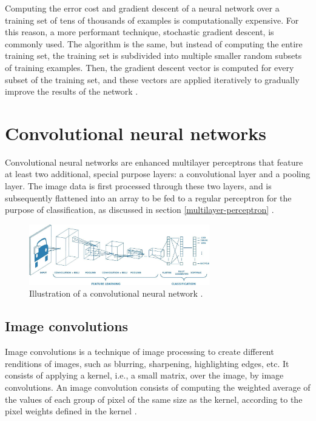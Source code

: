 \documentclass[12pt,a4paper,notitlepage]{article}
\begin{document}
Computing the error cost and gradient descent of a neural network over a training set of tens of thousands of examples is computationally expensive. For this reason, a more performant technique, stochastic gradient descent, is commonly used. The algorithm is the same, but instead of computing the entire training set, the training set is subdivided into multiple smaller random subsets of training examples. Then, the gradient descent vector is computed for every subset of the training set, and these vectors are applied iteratively to gradually improve the results of the network \cite{sanderson_gradient_2017}.

\section{Convolutional neural networks}
Convolutional neural networks are enhanced multilayer perceptrons that feature at least two additional, special purpose layers: a convolutional layer and a pooling layer. The image data is first processed through these two layers, and is subsequently flattened into an array to be fed to a regular perceptron for the purpose of classification, as discussed in section \ref{multilayer-perceptron} \cite{saha_comprehensive_2018}.

\begin{figure}[htbp]
	\centering
		\includegraphics[width=0.70\textwidth]{images/convolutional-neural-network.jpeg}
	\caption{Illustration of a convolutional neural network \cite{saha_comprehensive_2018}.}
	\label{fig:convolutional-neural-network}
\end{figure}

\subsection{Image convolutions}
Image convolutions is a technique of image processing to create different renditions of images, such as blurring, sharpening, highlighting edges, etc. It consists of applying a kernel, i.e., a small matrix, over the image, by image convolutions. An image convolution consists of computing the weighted average of the values of each group of pixel of the same size as the kernel, according to the pixel weights defined in the kernel \cite{sanderson_convolutions_2020}.
\end{document}
